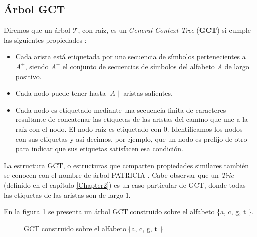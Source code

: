 \subsection{Árbol GCT}
\label{subsec:gct}
Diremos que un árbol $\mathcal{T}$, con raíz,  es un {\it General Context Tree} (\textbf{GCT}) si cumple las siguientes propiedades \cite{MSW04}:
\begin{itemize}
\item Cada arista está etiquetada por una secuencia de símbolos pertenecientes a {\it $A^{+}$}, siendo {\it $A^{+}$} el conjunto de secuencias de símbolos del alfabeto {\it A} de largo positivo.
\item Cada nodo puede tener hasta $\mid A \mid$ aristas salientes.
\item Cada nodo es etiquetado mediante una secuencia finita de caracteres resultante de concatenar las etiquetas de las aristas del camino que une a la raíz con el nodo. El nodo raíz es etiquetado con 0. Identificamos los nodos con sus etiquetas y así decimos, por ejemplo, que un nodo es prefijo de otro para indicar que sus etiquetas satisfacen esa condición.
\end{itemize}
La estructura GCT, o estructuras que comparten propiedades similares también se conocen con el nombre de árbol PATRICIA \cite{PAT}. Cabe observar que un {\it Trie} (definido en el capítulo \ref{Chapter2}) es un caso particular de GCT, donde todas las etiquetas de las aristas son de largo 1.
\begin{example*}
En la figura \ref{fig:gct} se presenta un árbol GCT construido sobre el alfabeto \{a, c, g, t \}.
\begin{figure}[H]
\centering
{}
\caption[Ejemplo: GCT]{GCT construido sobre el alfabeto \{a, c, g, t \}}
	\label{fig:gct}
\end{figure}
\end{example*}
\myrule{}{}
